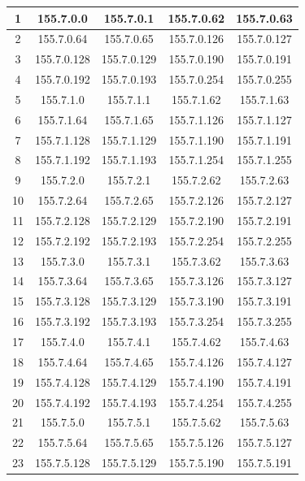 \documentclass[letterpaper,12pt]{article}
\begin{document}
\begin{longtable}{|c|c|c|c|c|}
        1 & 155.7.0.0 & 155.7.0.1 & 155.7.0.62 & 155.7.0.63 \\ \hline
        2 & 155.7.0.64 & 155.7.0.65 & 155.7.0.126 & 155.7.0.127 \\ \hline
        3 & 155.7.0.128 & 155.7.0.129 & 155.7.0.190 & 155.7.0.191 \\ \hline
        4 & 155.7.0.192 & 155.7.0.193 & 155.7.0.254 & 155.7.0.255 \\ \hline
        5 & 155.7.1.0 & 155.7.1.1 & 155.7.1.62 & 155.7.1.63 \\ \hline
        6 & 155.7.1.64 & 155.7.1.65 & 155.7.1.126 & 155.7.1.127 \\ \hline
        7 & 155.7.1.128 & 155.7.1.129 & 155.7.1.190 & 155.7.1.191 \\ \hline
        8 & 155.7.1.192 & 155.7.1.193 & 155.7.1.254 & 155.7.1.255 \\ \hline
        9 & 155.7.2.0 & 155.7.2.1 & 155.7.2.62 & 155.7.2.63 \\ \hline
        10 & 155.7.2.64 & 155.7.2.65 & 155.7.2.126 & 155.7.2.127 \\ \hline
        11 & 155.7.2.128 & 155.7.2.129 & 155.7.2.190 & 155.7.2.191 \\ \hline
        12 & 155.7.2.192 & 155.7.2.193 & 155.7.2.254 & 155.7.2.255 \\ \hline
        13 & 155.7.3.0 & 155.7.3.1 & 155.7.3.62 & 155.7.3.63 \\ \hline
        14 & 155.7.3.64 & 155.7.3.65 & 155.7.3.126 & 155.7.3.127 \\ \hline
        15 & 155.7.3.128 & 155.7.3.129 & 155.7.3.190 & 155.7.3.191 \\ \hline
        16 & 155.7.3.192 & 155.7.3.193 & 155.7.3.254 & 155.7.3.255 \\ \hline
        17 & 155.7.4.0 & 155.7.4.1 & 155.7.4.62 & 155.7.4.63 \\ \hline
        18 & 155.7.4.64 & 155.7.4.65 & 155.7.4.126 & 155.7.4.127 \\ \hline
        19 & 155.7.4.128 & 155.7.4.129 & 155.7.4.190 & 155.7.4.191 \\ \hline
        20 & 155.7.4.192 & 155.7.4.193 & 155.7.4.254 & 155.7.4.255 \\ \hline
        21 & 155.7.5.0 & 155.7.5.1 & 155.7.5.62 & 155.7.5.63 \\ \hline
        22 & 155.7.5.64 & 155.7.5.65 & 155.7.5.126 & 155.7.5.127 \\ \hline
        23 & 155.7.5.128 & 155.7.5.129 & 155.7.5.190 & 155.7.5.191 \\ \hline

\end{longtable}
\end{document}
